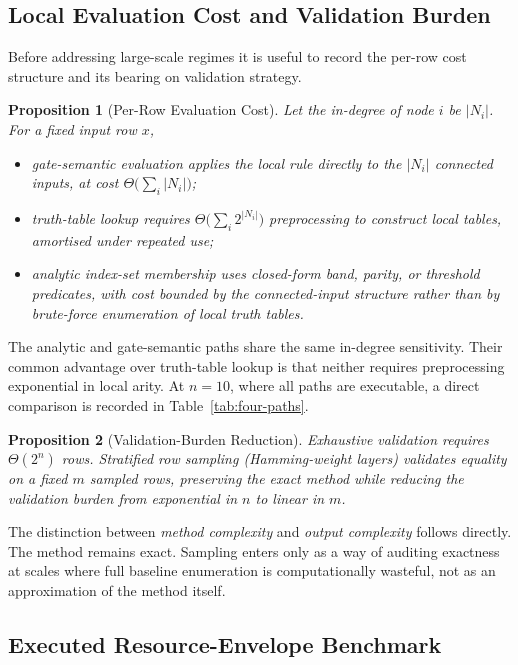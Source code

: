 \documentclass[11pt]{article}
\newtheorem{proposition}{Proposition}
\theoremstyle{definition}
\begin{document}
\subsection{Local Evaluation Cost and Validation Burden}

Before addressing large-scale regimes it is useful to record the per-row cost structure and its
bearing on validation strategy.

\begin{proposition}[Per-Row Evaluation Cost]\label{prop:per-row-cost}
Let the in-degree of node \(i\) be \(|N_i|\). For a fixed input row \(x\),
\begin{itemize}
\item gate-semantic evaluation applies the local rule directly to the \(|N_i|\) connected inputs,
  at cost \(\Theta\!\bigl(\sum_i|N_i|\bigr)\);
\item truth-table lookup requires \(\Theta\!\bigl(\sum_i 2^{|N_i|}\bigr)\) preprocessing to
  construct local tables, amortised under repeated use;
\item analytic index-set membership uses closed-form band, parity, or threshold predicates, with
  cost bounded by the connected-input structure rather than by brute-force enumeration of local
  truth tables.
\end{itemize}
\end{proposition}

The analytic and gate-semantic paths share the same in-degree sensitivity. Their common advantage
over truth-table lookup is that neither requires preprocessing exponential in local arity. At
\(n=10\), where all paths are executable, a direct comparison is recorded in
Table~\ref{tab:four-paths}.

\begin{proposition}[Validation-Burden Reduction]\label{prop:validation-burden}
Exhaustive validation requires \(\Theta(2^n)\) rows. Stratified row sampling (Hamming-weight layers)
validates equality on a fixed \(m\) sampled rows, preserving the exact method while reducing the validation
burden from exponential in \(n\) to linear in \(m\).
\end{proposition}

The distinction between \emph{method complexity} and \emph{output complexity} follows directly.
The method remains exact. Sampling enters only as a way of auditing exactness at scales where full
baseline enumeration is computationally wasteful, not as an approximation of the method itself.

\subsection{Executed Resource-Envelope Benchmark}
\end{document}
